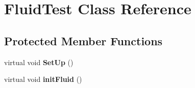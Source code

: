 \hypertarget{classFluidTest}{\section{\-Fluid\-Test \-Class \-Reference}
\label{classFluidTest}
}
\subsection*{\-Protected \-Member \-Functions}
\begin{DoxyCompactItemize}
\item 
\hypertarget{classFluidTest_a9daf3df50e9d26818bfbc26d3f7bca48}{virtual void {\bfseries \-Set\-Up} ()}\label{classFluidTest_a9daf3df50e9d26818bfbc26d3f7bca48}

\item 
\hypertarget{classFluidTest_acdc98b3151cb72515dff5e027a7899a5}{virtual void {\bfseries init\-Fluid} ()}\label{classFluidTest_acdc98b3151cb72515dff5e027a7899a5}

\end{DoxyCompactItemize}
